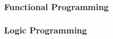 \documentclass[12pt,t]{beamer}
\begin{document}
\begin{frame}
\frametitle{Functional Programming}
\begin{block}{}
\end{block}
\end{frame}

\begin{frame}
\frametitle{Logic Programming}
\begin{block}{}
\end{block}
\end{frame}







\end{document}
